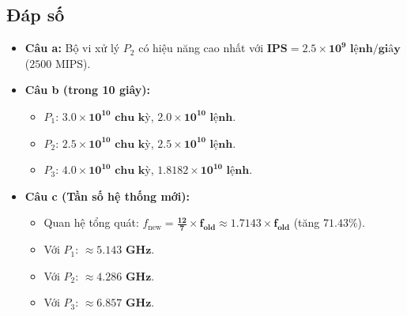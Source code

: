\documentclass[a4paper]{article}
\numberwithin{figure}{section}
\numberwithin{table}{section}
\begin{document}
\subsection{Đáp số}
\begin{answerbox}
\begin{itemize}[leftmargin=1.0cm]
    \item \textbf{Câu a:} Bộ vi xử lý \textbf{$P_2$} có hiệu năng cao nhất với $\mathbf{\text{IPS} = 2.5 \times 10^9\text{ lệnh/giây}}$ ($2500$ MIPS).
    \item \textbf{Câu b (trong 10 giây):}
    \begin{itemize}
        \item $P_1$: $\mathbf{3.0 \times 10^{10}\text{ chu kỳ}}$, $\mathbf{2.0 \times 10^{10}\text{ lệnh}}$.
        \item $P_2$: $\mathbf{2.5 \times 10^{10}\text{ chu kỳ}}$, $\mathbf{2.5 \times 10^{10}\text{ lệnh}}$.
        \item $P_3$: $\mathbf{4.0 \times 10^{10}\text{ chu kỳ}}$, $\mathbf{1.8182 \times 10^{10}\text{ lệnh}}$.
    \end{itemize}
    \item \textbf{Câu c (Tần số hệ thống mới):}
    \begin{itemize}
        \item Quan hệ tổng quát: $f_{\text{new}} = \mathbf{\frac{12}{7} \times f_{\text{old}}} \approx \mathbf{1.7143 \times f_{\text{old}}}$ (tăng $\mathbf{71.43\%}$).
        \item Với $P_1$: $\approx \mathbf{5.143\text{ GHz}}$.
        \item Với $P_2$: $\approx \mathbf{4.286\text{ GHz}}$.
        \item Với $P_3$: $\approx \mathbf{6.857\text{ GHz}}$.
    \end{itemize}
\end{itemize}
\end{answerbox}
\end{document}
